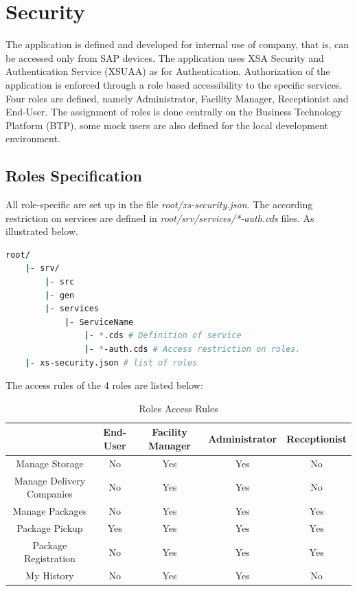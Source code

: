 \section{Security}
The application is defined and developed for internal use of company, that is, can be accessed only from SAP devices. The application uses XSA Security and Authentication Service (XSUAA) as for Authentication. Authorization of the application is enforced through a role based accessibility to the specific services. Four roles are defined, namely Administrator, Facility Manager, Receptionist and End-User. The assignment of roles is done centrally on the Business Technology Platform (BTP), some mock users are also defined for the local development environment.


\subsection{Roles Specification}
All role-specific are set up in the file \textit{root/xs-security.json}. The according restriction on services are defined in \textit{root/srv/services/*-auth.cds} files. As illustrated below.

\begin{lstlisting}[language={bash}]
root/
    |- srv/
        |- src
        |- gen
        |- services
            |- ServiceName 
                |- *.cds # Definition of service
                |- *-auth.cds # Access restriction on roles.
    |- xs-security.json # list of roles
\end{lstlisting}

The access rules of the 4 roles are listed below:

\begin{table}[H]
    \centering
    \begin{tabular}{|c|c|c|c|c|} \hline 
         &  End-User&  Facility Manager&  Administrator&  Receptionist \\ \hline 
         Manage Storage& No  & Yes & Yes & No  \\ \hline 
         Manage Delivery Companies& No & Yes & Yes & No  \\ \hline 
         Manage Packages& No & Yes & Yes & Yes \\ \hline 
         Package Pickup& Yes & Yes & Yes & Yes  \\ \hline 
         Package Registration& No & Yes & Yes & Yes \\ \hline 
         My History& No & Yes & Yes & No \\ \hline
    \end{tabular}
    \caption{Roles Access Rules}
    \label{tab:Access Rule}
\end{table}

